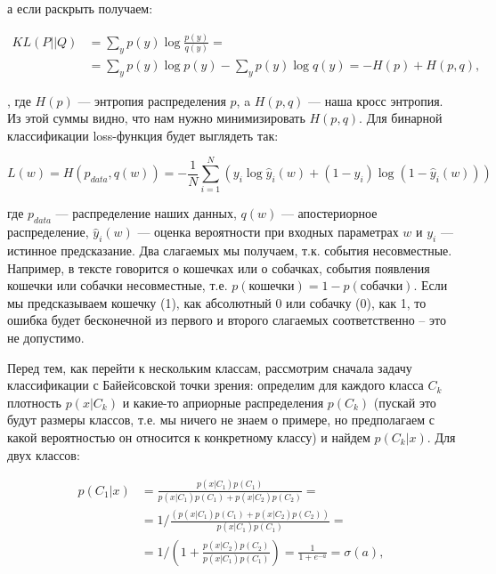 а если раскрыть получаем:

\begin{equation}
\begin{aligned}
 KL(P||Q) & = \sum_y p(y)\log\frac{p(y)}{q(y)} = \\
 & = \sum_y p(y) \log p(y) - \sum_y p(y) \log q(y) = - H(p) + H(p,q),
\end{aligned}
\end{equation}

, где $H(p)$ ---  энтропия распределения $p$, a $H(p, q)$ --- наша кросс энтропия. Из этой суммы видно, что
нам нужно минимизировать $H(p, q)$. Для бинарной классификации loss-функция будет выглядеть так:

\begin{equation} \label{eq:logLoss}
 L(w)= H(p_{data}, q(w)) = -\frac{1}{N}\sum_{i=1}^N(y_i\log\hat y_i(w) + (1-y_i)\log(1-\hat y_i(w)))
\end{equation}

где $p_{data}$ --- распределение наших данных, $q(w)$ --- апостериорное распределение,  $\hat y_i(w)$ ---
оценка вероятности при входных параметрах $w$ и $y_i$ --- истинное предсказание. Два слагаемых мы получаем,
т.к. события несовместные. Например, в тексте говорится о кошечках или о собачках, события появления кошечки
или собачки несовместные, т.е. $p(\text{кошечки}) = 1 - p(\text{собачки})$. Если мы предсказываем кошечку (1),
как абсолютный 0 или собачку (0), как 1, то ошибка будет бесконечной из первого и второго слагаемых
соответственно -- это не допустимо.

Перед тем, как перейти к нескольким классам, рассмотрим сначала задачу классификации с Байейсовской точки
зрения: определим для каждого класса $C_k$ плотность $p(x|C_k)$ и какие-то априорные распределения $p(C_k)$
(пускай это будут размеры классов, т.е. мы ничего не знаем о примере, но предполагаем с какой вероятностью он
относится к конкретному классу) и найдем $p(C_k|x)$. Для двух классов:

\begin{equation}
\begin{aligned}
 p(C_1|x) & = \frac{p(x|C_1)p(C_1)}{p(x|C_1)p(C_1)+p(x|C_2)p(C_2)} = \\
 & = 1/\frac{(p(x|C_1)p(C_1)+p(x|C_2)p(C_2))}{p(x|C_1)p(C_1)} = \\
 & = 1/(1+\frac{p(x|C_2)p(C_2)}{p(x|C_1)p(C_1)}) = \frac{1}{1+e^{-a}} = \sigma (a),
\end{aligned}
\end{equation}

